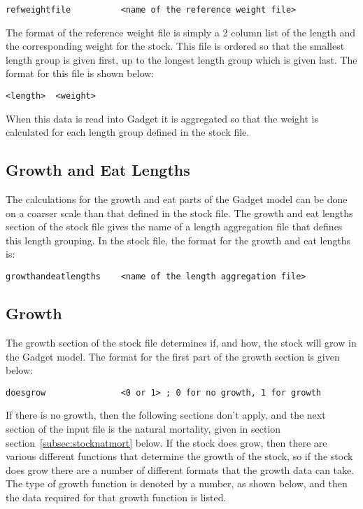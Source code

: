 \documentclass [a4paper, 10pt]{book}
\begin{document}
\begin{verbatim}
refweightfile          <name of the reference weight file>
\end{verbatim}

The format of the reference weight file is simply a 2 column list of the length and the corresponding weight for the stock.  This file is ordered so that the smallest length group is given first, up to the longest length group which is given last.  The format for this file is shown below:

\begin{verbatim}
<length>  <weight>
\end{verbatim}

When this data is read into Gadget it is aggregated so that the weight is calculated for each length group defined in the stock file.

\subsection{Growth and Eat Lengths}\label{subsec:stockgrowthlength}
The calculations for the growth and eat parts of the Gadget model can be done on a coarser scale than that defined in the stock file.  The growth and eat lengths section of the stock file gives the name of a length aggregation file that defines this length grouping.  In the stock file, the format for the growth and eat lengths is:

\begin{verbatim}
growthandeatlengths    <name of the length aggregation file>
\end{verbatim}

\subsection{Growth}\label{subsec:stockgrowth}
The growth section of the stock file determines if, and how, the stock will grow in the Gadget model.  The format for the first part of the growth section is given below:

\begin{verbatim}
doesgrow               <0 or 1> ; 0 for no growth, 1 for growth
\end{verbatim}

If there is no growth, then the following sections don't apply, and the next section of the input file is the natural mortality, given in section section~\ref{subsec:stocknatmort} below.  If the stock does grow, then there are various different functions that determine the growth of the stock, so if the stock does grow there are a number of different formats that the growth data can take.  The type of growth function is denoted by a number, as shown below, and then the data required for that growth function is listed.
\end{document}
